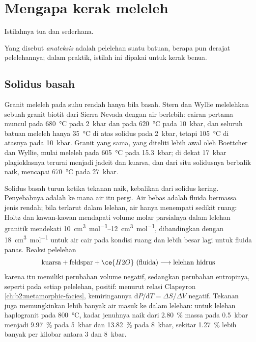 \section{Mengapa kerak meleleh}\label{sec:b2:crustal-melting:why}

Istilahnya tua dan sederhana.

\begin{definition}[Anateksis]\label{def:b2:crustal-melting:anatexis}
Yang disebut \emph{anateksis} adalah pelelehan suatu batuan, berapa pun derajat pelelehannya;
dalam praktik, istilah ini dipakai untuk  kerak benua.
\end{definition}

\subsection*{Solidus basah}

Granit meleleh pada suhu rendah hanya bila basah. Stern dan Wyllie melelehkan sebuah granit
biotit dari  Sierra Nevada dengan air berlebih: cairan pertama muncul pada
\qty{680}{\celsius} pada \qty{2}{kbar} dan pada \qty{620}{\celsius} pada \qty{10}{kbar}, dan
seluruh batuan meleleh hanya \qty{35}{\celsius} di atas solidus pada \qty{2}{kbar}, tetapi
\qty{105}{\celsius} di atasnya pada \qty{10}{kbar}. Granit yang sama, yang diteliti lebih awal oleh
Boettcher dan Wyllie, mulai meleleh pada \qty{605}{\celsius} pada \qty{15.3}{kbar}; di dekat
\qty{17}{kbar} plagioklasnya terurai menjadi jadeit dan kuarsa, dan dari situ solidusnya
berbalik naik, mencapai \qty{670}{\celsius} pada \qty{27}{kbar}.

Solidus basah turun ketika tekanan naik, kebalikan dari solidus kering. Penyebabnya adalah ke mana
air itu pergi. Air bebas adalah fluida bermassa jenis rendah; bila terlarut dalam lelehan, air hanya menempati
sedikit ruang: Holtz dan kawan-kawan mendapati volume molar parsialnya dalam lelehan granitik mendekati
\qtyrange{10}{12}{\cubic\centi\metre\per\mole}, dibandingkan dengan \qty{18}{\cubic\centi\metre\per\mole}
untuk air cair pada kondisi ruang dan lebih besar lagi untuk fluida panas. Reaksi pelelehan
\[\text{kuarsa} + \text{feldspar} + \ce{H2O}\ (\text{fluida}) \longrightarrow
\text{lelehan hidrus}\]
karena itu memiliki perubahan volume negatif, sedangkan perubahan entropinya, seperti pada setiap pelelehan,
positif: menurut relasi Clapeyron \cref{ch:b2:metamorphic-facies}, kemiringannya
$\mathrm{d}P/\mathrm{d}T = \Delta S/\Delta V$ negatif. Tekanan juga memungkinkan lebih banyak air
masuk ke dalam lelehan: untuk lelehan haplogranit pada \qty{800}{\celsius}, kadar jenuhnya naik
dari \qty{2.80}{\percent} massa pada \qty{0.5}{kbar} menjadi \qty{9.97}{\percent} pada
\qty{5}{kbar} dan \qty{13.82}{\percent} pada \qty{8}{kbar}, sekitar \qty{1.27}{\percent} lebih banyak
per kilobar antara 3 dan \qty{8}{kbar}.

